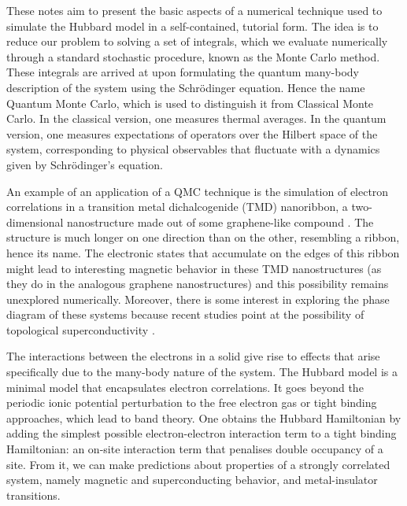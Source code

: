 
\label{cap:finiteTafqmc}

These notes aim to present the basic aspects of a numerical technique used to simulate the Hubbard model in a self-contained, tutorial form. The idea is to reduce our problem to solving a set of integrals, which we evaluate numerically through a standard stochastic procedure, known as the Monte Carlo method. These integrals are arrived at upon formulating the quantum many-body description of the system using the Schr\"odinger equation. Hence the name Quantum Monte Carlo, which is used to distinguish it from Classical Monte Carlo. In the classical version, one measures thermal averages. In the quantum version, one measures expectations of operators over the Hilbert space of the system, corresponding to physical observables that fluctuate with a dynamics given by Schr\"odinger's equation.

An example of an application of a QMC technique is the simulation of electron correlations in a transition metal dichalcogenide (TMD) nanoribbon, a two-dimensional nanostructure made out of some graphene-like compound \cite{Yang2017, Raczkowski2017, Chen2017, Wang2012, Braz2017}. The structure is much longer on one direction than on the other, resembling a ribbon, hence its name. The electronic states that accumulate on the edges of this ribbon might lead to interesting magnetic behavior in these TMD nanostructures (as they do in the analogous graphene nanostructures\cite{Yazyev2010}) and this possibility remains unexplored numerically\cite{Feldner2011, Golor2013}. Moreover, there is some interest in exploring the phase diagram of these systems because recent studies point at the possibility of topological superconductivity \cite{Hsu2017}.

The interactions between the electrons in a solid give rise to effects that arise specifically due to the many-body nature of the system. The Hubbard model is a minimal model that encapsulates electron correlations. It goes beyond the periodic ionic potential perturbation to the free electron gas or tight binding approaches, which lead to band theory. One obtains the Hubbard Hamiltonian by adding the simplest possible electron-electron interaction term to a tight binding Hamiltonian: an on-site interaction term that penalises double occupancy of a site. From it, we can make predictions about properties of a strongly correlated system, namely magnetic and superconducting behavior, and metal-insulator transitions.

